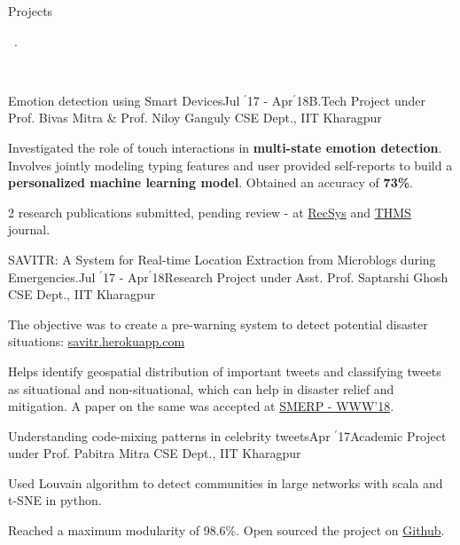 \documentclass[11pt, a4paper]{resume}
\newcommand{\important}[1]{
  \textcolor{mypurple}{#1}
}
\newcommand{\fillit}[1]{
  \leavevmode\xleaders\hbox{#1}\hfill\kern0pt
}
\newcommand{\sectionSubtitleX}[1]{
  \begin{large}
    \important{#1}
    \end{large}
    \fillit{\important{.}}
}
\begin{document}
\sectionSubtitleX{Projects}
\\
\begin{rSubsection}{Emotion detection using Smart Devices}{Jul $^{\prime}$17 - Apr$^{\prime}$18}{B.Tech Project under Prof. Bivas Mitra \& Prof. Niloy Ganguly}{\hspace*{\fill} CSE Dept., IIT Kharagpur}
\item Investigated the role of touch interactions in {\bf multi-state emotion detection}. Involves jointly modeling typing features and  user provided self-reports to build a {\bf personalized machine learning model}. Obtained an accuracy of {\bf 73\%}.
\item 2 research publications submitted, pending review - at \href{https://recsys.acm.org/recsys18/}{RecSys} and \href{http://www.ieeesmc.org/publications/transactions-on-human-machine-systems}{THMS} journal.
\end{rSubsection}

\begin{rSubsection}{SAVITR: A System for Real-time Location Extraction from Microblogs during Emergencies.}{Jul $^{\prime}$17 - Apr$^{\prime}$18}{Research Project under Asst. Prof. Saptarshi Ghosh}{\hspace*{\fill} CSE Dept., IIT Kharagpur}
\item The objective was to create a pre-warning system to detect potential disaster situations: \href{http://savitr.herokuapp.com}{savitr.herokuapp.com}
\item Helps identify geospatial distribution of important tweets and classifying tweets as situational and non-situational, which can help in disaster relief and mitigation. A paper on the same was accepted at \href{https://www.cse.iitk.ac.in/users/kripa/smerp2018/}{SMERP - WWW'18}.
\end{rSubsection}

\begin{rSubsection}{Understanding code-mixing patterns in celebrity tweets}{Apr $^{\prime}$17}{Academic Project under Prof. Pabitra Mitra}{\hspace*{\fill} CSE Dept., IIT Kharagpur}
\item Used Louvain algorithm to detect communities in large networks with scala and t-SNE in python.
\item Reached a maximum modularity of 98.6\%. Open sourced the project on \href{https://github.com/kaustubhhiware/Graphwise}{Github}.
\end{rSubsection}
\end{document}
